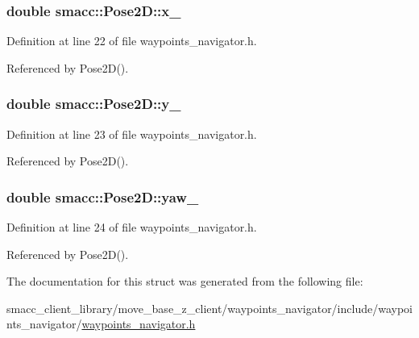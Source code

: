 \subsubsection[{\texorpdfstring{x\+\_\+}{x_}}]{\setlength{\rightskip}{0pt plus 5cm}double smacc\+::\+Pose2\+D\+::x\+\_\+}\hypertarget{structsmacc_1_1Pose2D_a8f876eecc29329305779a9fbe5e827bb}{}\label{structsmacc_1_1Pose2D_a8f876eecc29329305779a9fbe5e827bb}


Definition at line 22 of file waypoints\+\_\+navigator.\+h.



Referenced by Pose2\+D().

\subsubsection[{\texorpdfstring{y\+\_\+}{y_}}]{\setlength{\rightskip}{0pt plus 5cm}double smacc\+::\+Pose2\+D\+::y\+\_\+}\hypertarget{structsmacc_1_1Pose2D_a29508b823676c1591fb5969858f1193a}{}\label{structsmacc_1_1Pose2D_a29508b823676c1591fb5969858f1193a}


Definition at line 23 of file waypoints\+\_\+navigator.\+h.



Referenced by Pose2\+D().

\subsubsection[{\texorpdfstring{yaw\+\_\+}{yaw_}}]{\setlength{\rightskip}{0pt plus 5cm}double smacc\+::\+Pose2\+D\+::yaw\+\_\+}\hypertarget{structsmacc_1_1Pose2D_a79f207f922e6eed40846e6443456f7ba}{}\label{structsmacc_1_1Pose2D_a79f207f922e6eed40846e6443456f7ba}


Definition at line 24 of file waypoints\+\_\+navigator.\+h.



Referenced by Pose2\+D().



The documentation for this struct was generated from the following file\+:\begin{DoxyCompactItemize}
\item 
smacc\+\_\+client\+\_\+library/move\+\_\+base\+\_\+z\+\_\+client/waypoints\+\_\+navigator/include/waypoints\+\_\+navigator/\hyperlink{waypoints__navigator_8h}{waypoints\+\_\+navigator.\+h}\end{DoxyCompactItemize}

